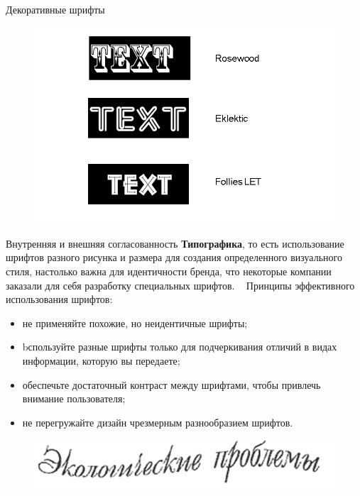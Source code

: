 \documentclass{beamer}
\begin{document}
\begin{frame}[t]{Декоративные шрифты}
	\begin{figure}[h]
		\centering
		\includegraphics[scale=0.5]{images/lec05-pic10.png}
	\end{figure}
\end{frame}  

\begin{frame}[t]{Внутренняя и внешняя согласованность}
	\textbf{Типографика}, то есть использование шрифтов разного рисунка и размера для создания определенного визуального стиля, настолько важна для идентичности бренда, что некоторые компании заказали для себя разработку специальных шрифтов. 
	~
	Принципы эффективного использования шрифтов: 
	\begin{itemize}
		\item не применяйте похожие, но неидентичные шрифты; 
		\item bспользуйте разные шрифты только для подчеркивания отличий в видах информации, которую вы передаете;
		\item обеспечьте достаточный контраст между шрифтами, чтобы привлечь внимание пользователя;
		\item не перегружайте дизайн чрезмерным разнообразием шрифтов.
	\end{itemize}
	\begin{figure}[h]
		\centering
		\includegraphics[scale=0.5]{images/lec05-pic11.png}
	\end{figure}	
\end{frame}
\end{document}
